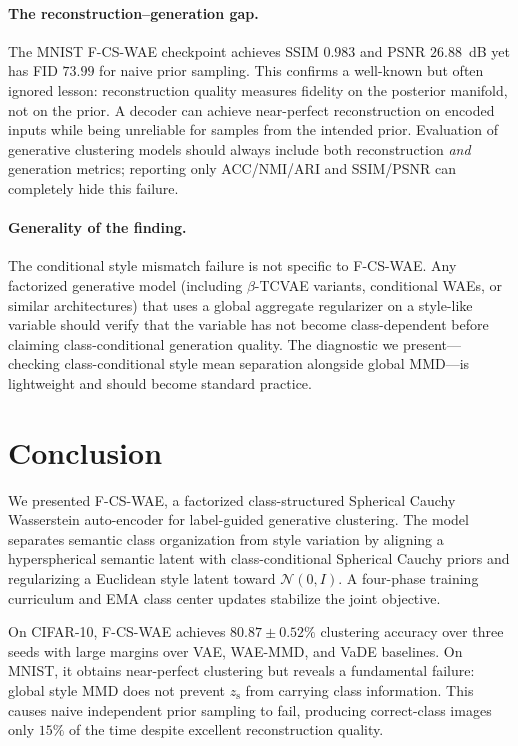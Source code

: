 \documentclass[10pt]{article}
\newcommand{\ours}{F-CS-WAE}
\newcommand{\zs}{z_{\mathrm{s}}}
\begin{document}
\paragraph{The reconstruction--generation gap.}
The MNIST \ours{} checkpoint achieves SSIM $0.983$ and PSNR $26.88$~dB yet has
FID $73.99$ for naive prior sampling.
This confirms a well-known but often ignored lesson: reconstruction quality measures
fidelity on the posterior manifold, not on the prior.
A decoder can achieve near-perfect reconstruction on encoded inputs while being
unreliable for samples from the intended prior.
Evaluation of generative clustering models should always include both reconstruction
\emph{and} generation metrics; reporting only ACC/NMI/ARI and SSIM/PSNR can
completely hide this failure.

\paragraph{Generality of the finding.}
The conditional style mismatch failure is not specific to \ours.
Any factorized generative model (including $\beta$-TCVAE variants, conditional WAEs,
or similar architectures) that uses a global aggregate regularizer on a style-like
variable should verify that the variable has not become class-dependent before
claiming class-conditional generation quality.
The diagnostic we present---checking class-conditional style mean separation
alongside global MMD---is lightweight and should become standard practice.

\section{Conclusion}

We presented \ours{}, a factorized class-structured Spherical Cauchy Wasserstein
auto-encoder for label-guided generative clustering.
The model separates semantic class organization from style variation by aligning a
hyperspherical semantic latent with class-conditional Spherical Cauchy priors
and regularizing a Euclidean style latent toward $\mathcal{N}(0,I)$.
A four-phase training curriculum and EMA class center updates stabilize the
joint objective.

On CIFAR-10, \ours{} achieves $80.87\pm0.52\%$ clustering accuracy over three seeds
with large margins over VAE, WAE-MMD, and VaDE baselines.
On MNIST, it obtains near-perfect clustering but reveals a fundamental failure:
global style MMD does not prevent $\zs$ from carrying class information.
This causes naive independent prior sampling to fail, producing correct-class images
only $15\%$ of the time despite excellent reconstruction quality.
\end{document}
